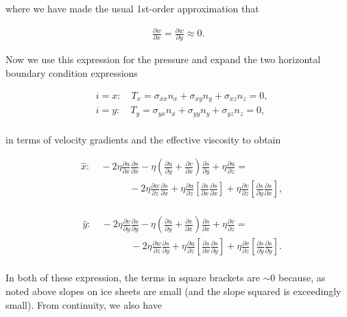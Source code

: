 where we have made the usual 1st-order approximation that 

\begin{align*}
\frac{\partial w}{\partial x}=\frac{\partial w}{\partial y}\approx 0.
\end{align*}

Now we use this expression for the pressure and expand the two horizontal boundary condition expressions

\begin{align*}
  & i=x:\quad T_{x}=\sigma _{xx}n_{x}+\sigma _{xy}n_{y}+\sigma _{xz}n_{z}=0, \\ 
 & i=y:\quad T_{y}=\sigma _{yx}n_{x}+\sigma _{yy}n_{y}+\sigma _{yz}n_{z}=0, \\
 \end{align*}

in terms of velocity gradients and the effective viscosity to obtain

\begin{align*}
   {} & \hat{x}:\quad -2\eta \frac{\partial u}{\partial x}\frac{\partial s}{\partial x}-\eta \left( \frac{\partial u}{\partial y}+\frac{\partial v}{\partial x} \right)\frac{\partial s}{\partial y}+\eta \frac{\partial u}{\partial z}=  \\
   {} & \quad \quad \quad \quad \quad -2\eta \frac{\partial w}{\partial z}\frac{\partial s}{\partial x}+\eta \frac{\partial u}{\partial z}\left[ \frac{\partial s}{\partial x}\frac{\partial s}{\partial x} \right]+\eta \frac{\partial v}{\partial z}\left[ \frac{\partial s}{\partial y}\frac{\partial s}{\partial x} \right],  \\
\end{align*}

\begin{align*}
   {} & \hat{y}:\quad -2\eta \frac{\partial v}{\partial y}\frac{\partial s}{\partial y}-\eta \left( \frac{\partial u}{\partial y}+\frac{\partial v}{\partial x} \right)\frac{\partial s}{\partial x}+\eta \frac{\partial v}{\partial z}=  \\
   {} & \quad \quad \quad \quad \quad -2\eta \frac{\partial w}{\partial z}\frac{\partial s}{\partial y}+\eta \frac{\partial u}{\partial z}\left[ \frac{\partial s}{\partial x}\frac{\partial s}{\partial y} \right]+\eta \frac{\partial v}{\partial z}\left[ \frac{\partial s}{\partial y}\frac{\partial s}{\partial y} \right].  \\
\end{align*}

In both of these expression, the terms in square brackets are $\sim{0}$ because, as noted above slopes on ice sheets are small (and the slope squared is exceedingly small). From continuity, we also have

